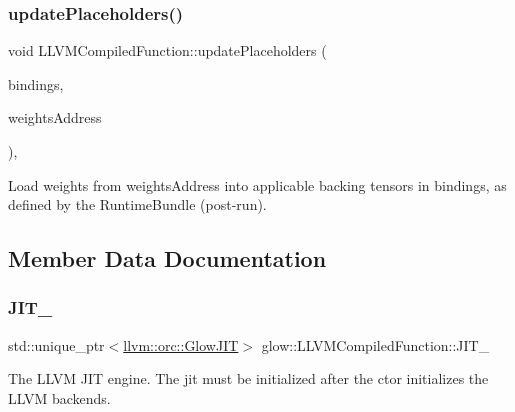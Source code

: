 \subsubsection{\texorpdfstring{update\+Placeholders()}{updatePlaceholders()}}
{\footnotesize\ttfamily void L\+L\+V\+M\+Compiled\+Function\+::update\+Placeholders (\begin{DoxyParamCaption}\item[{\hyperlink{classglow_1_1_placeholder_bindings}{Placeholder\+Bindings} $\ast$}]{bindings,  }\item[{uint8\+\_\+t $\ast$}]{weights\+Address }\end{DoxyParamCaption})\hspace{0.3cm}{\ttfamily [protected]}, {\ttfamily [virtual]}}

Load weights from {\ttfamily weights\+Address} into applicable backing tensors in {\ttfamily bindings}, as defined by the Runtime\+Bundle (post-\/run). 

\subsection{Member Data Documentation}
\mbox{\label{classglow_1_1_l_l_v_m_compiled_function_a87658ead1ed9f3e8647fcc2e3c925652}} 
\subsubsection{\texorpdfstring{J\+I\+T\+\_\+}{JIT\_}}
{\footnotesize\ttfamily std\+::unique\+\_\+ptr$<$\hyperlink{classllvm_1_1orc_1_1_glow_j_i_t}{llvm\+::orc\+::\+Glow\+J\+IT}$>$ glow\+::\+L\+L\+V\+M\+Compiled\+Function\+::\+J\+I\+T\+\_\+\hspace{0.3cm}{\ttfamily [protected]}}

The L\+L\+VM J\+IT engine. The jit must be initialized after the ctor initializes the L\+L\+VM backends. \mbox{\label{classglow_1_1_l_l_v_m_compiled_function_a93d54be72c9d719695d4341a56f70a50}} 
